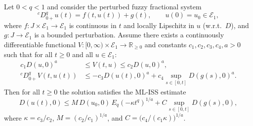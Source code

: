 \documentclass[10pt,a4paper]{amsart}
\newcommand{\E}{\mathcal{E}_1}
\newcommand{\Haus}{D}
\begin{document}
	\begin{theorem}[ML-ISS]\label{thm:ML-ISS}
		Let \(0<q<1\) and consider the perturbed fuzzy fractional system
		\[
		{}^cD_{0+}^q u(t)=f(t,u(t))+g(t),\qquad u(0)=u_0\in\E,
		\]
		where \(f:J\times\E\to\E\) is continuous in \(t\) and locally Lipschitz in \(u\) (w.r.t.\ \(\Haus\)), and \(g:J\to\E\) is a bounded perturbation. Assume there exists a continuously differentiable functional \(V:[0,\infty)\times\E\to\mathbb{R}_{\ge0}\) and constants \(c_1,c_2,c_3,c_4,a>0\) such that for all \(t\ge0\) and all \(u\in\E\):
		\begin{align}
			c_1\Haus(u,0)^a &\le V(t,u)\le c_2\Haus(u,0)^a,\label{V-bounds}\\
			{}^cD_{0+}^q V(t,u(t)) &\le -c_3\Haus(u(t),0)^a + c_4\sup_{s\in[0,t]}\Haus(g(s),0)^a.\label{V-derivative-ineq}
		\end{align}
		Then for all \(t\ge0\) the solution satisfies the ML-ISS estimate
		\begin{equation}\label{ISS-estimate}
			\Haus(u(t),0)\le M\,\Haus(u_0,0)\,E_q(-\kappa t^q)^{1/a}+C\sup_{s\in[0,t]}\Haus(g(s),0),
		\end{equation}
		where \(\kappa=c_3/c_2\), \(M=(c_2/c_1)^{1/a}\), and \(C=\big(c_4/(c_1\kappa)\big)^{1/a}\).
	\end{theorem}
\end{document}
